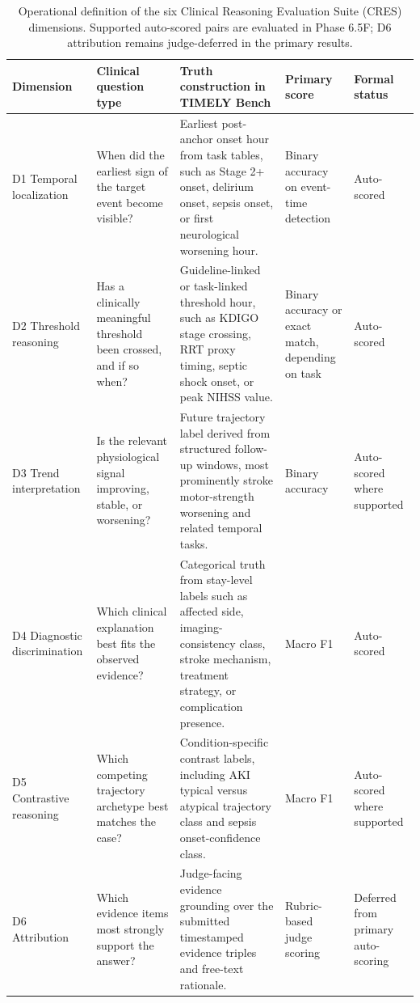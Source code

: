 \begin{table}[t]
\caption{Operational definition of the six Clinical Reasoning Evaluation Suite (CRES) dimensions. Supported auto-scored pairs are evaluated in Phase 6.5F; D6 attribution remains judge-deferred in the primary results.}
\label{tab:cres_dimensions}
\centering
\small
\setlength{\tabcolsep}{4pt}
\begin{tabularx}{\textwidth}{>{\raggedright\arraybackslash}p{} >{\raggedright\arraybackslash}p{} >{\raggedright\arraybackslash}X >{\raggedright\arraybackslash}p{} >{\raggedright\arraybackslash}p{}}
\toprule
Dimension & Clinical question type & Truth construction in TIMELY Bench & Primary score & Formal status \\
\midrule
D1 Temporal localization & When did the earliest sign of the target event become visible? & Earliest post-anchor onset hour from task tables, such as Stage 2+ onset, delirium onset, sepsis onset, or first neurological worsening hour. & Binary accuracy on event-time detection & Auto-scored \\
D2 Threshold reasoning & Has a clinically meaningful threshold been crossed, and if so when? & Guideline-linked or task-linked threshold hour, such as KDIGO stage crossing, RRT proxy timing, septic shock onset, or peak NIHSS value. & Binary accuracy or exact match, depending on task & Auto-scored \\
D3 Trend interpretation & Is the relevant physiological signal improving, stable, or worsening? & Future trajectory label derived from structured follow-up windows, most prominently stroke motor-strength worsening and related temporal tasks. & Binary accuracy & Auto-scored where supported \\
D4 Diagnostic discrimination & Which clinical explanation best fits the observed evidence? & Categorical truth from stay-level labels such as affected side, imaging-consistency class, stroke mechanism, treatment strategy, or complication presence. & Macro F1 & Auto-scored \\
D5 Contrastive reasoning & Which competing trajectory archetype best matches the case? & Condition-specific contrast labels, including AKI typical versus atypical trajectory class and sepsis onset-confidence class. & Macro F1 & Auto-scored where supported \\
D6 Attribution & Which evidence items most strongly support the answer? & Judge-facing evidence grounding over the submitted timestamped evidence triples and free-text rationale. & Rubric-based judge scoring & Deferred from primary auto-scoring \\
\bottomrule
\end{tabularx}
\end{table}
